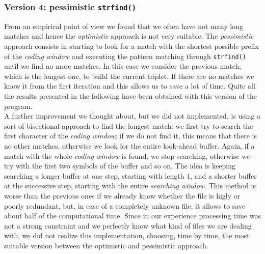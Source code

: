 \subsubsection{Version 4: pessimistic \texttt{strfind()}} \label{subsubsec:pess}
From an empirical point of view we found that we often have not many long matches and hence the \textit{optimistic} approach is not very suitable. The \textit{pessimistic} approach consists in starting to look for a match with the shortest possible prefix of the \textit{coding window} and executing the pattern matching through \texttt{strfind()} until we find no more matches. In this case we consider the previous match, which is the longest one, to build the current triplet. If there are no matches we know it from the first iteration and this allows us to save a lot of time. Quite all the results presented in the following have been obtained with this version of the program.
\\

A further improvement we thought about, but we did not implemented, is using a sort of bisectional approach to find the longest match: we first try to search the first character of the \textit{coding window}; if we do not find it, this means that there is no other matches, otherwise we look for the entire look-ahead buffer. Again, if a match with the whole \textit{coding window} is found, we stop searching, otherwise we try with the first two symbols of the buffer and so on. The idea is keeping searching a longer buffer at one step, starting with length $1$, and a shorter buffer at the successive step, starting with the entire \textit{searching window}. This method is worse than the previous ones if we already know whether the file is higly or poorly redundant, but, in case of a completely unknown file, it allows to save about half of the computational time. Since in our experience processing time was not a strong constraint and we perfectly know what kind of files we are dealing with, we did not realize this implementation, choosing, time by time, the most suitable version between the optimistic and pessimistic approach.